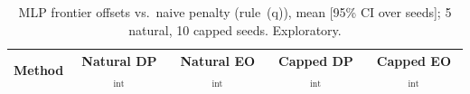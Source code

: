 \begin{table}[t]
\centering
\caption{MLP frontier offsets vs.\ naive penalty (rule~(q)), mean [95\% CI over seeds]; 5 natural, 10 capped seeds. Exploratory.}
\label{tab:mlpoff}
\small
\begin{tabular}{lcccc}
\toprule
Method & Natural DP$_\text{int}$ & Natural EO$_\text{int}$ & Capped DP$_\text{int}$ & Capped EO$_\text{int}$\\
\midrule

\bottomrule
\end{tabular}
\end{table}

